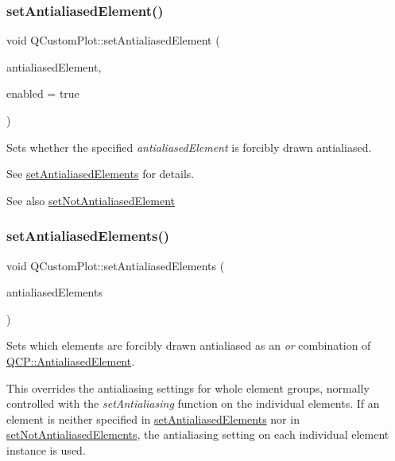 \subsubsection{\texorpdfstring{setAntialiasedElement()}{setAntialiasedElement()}}
{\footnotesize\ttfamily void Q\+Custom\+Plot\+::set\+Antialiased\+Element (\begin{DoxyParamCaption}\item[{\mbox{\hyperlink{namespace_q_c_p_ae55dbe315d41fe80f29ba88100843a0c}{Q\+C\+P\+::\+Antialiased\+Element}}}]{antialiased\+Element,  }\item[{bool}]{enabled = {\ttfamily true} }\end{DoxyParamCaption})}

Sets whether the specified {\itshape antialiased\+Element} is forcibly drawn antialiased.

See \mbox{\hyperlink{class_q_custom_plot_af6f91e5eab1be85f67c556e98c3745e8}{set\+Antialiased\+Elements}} for details.

\begin{DoxySeeAlso}{See also}
\mbox{\hyperlink{class_q_custom_plot_afc657938a707c890e449ae89203a076d}{set\+Not\+Antialiased\+Element}} 
\end{DoxySeeAlso}
\mbox{\label{class_q_custom_plot_af6f91e5eab1be85f67c556e98c3745e8}} 
\subsubsection{\texorpdfstring{setAntialiasedElements()}{setAntialiasedElements()}}
{\footnotesize\ttfamily void Q\+Custom\+Plot\+::set\+Antialiased\+Elements (\begin{DoxyParamCaption}\item[{const Q\+C\+P\+::\+Antialiased\+Elements \&}]{antialiased\+Elements }\end{DoxyParamCaption})}

Sets which elements are forcibly drawn antialiased as an {\itshape or} combination of \mbox{\hyperlink{namespace_q_c_p_ae55dbe315d41fe80f29ba88100843a0c}{Q\+C\+P\+::\+Antialiased\+Element}}.

This overrides the antialiasing settings for whole element groups, normally controlled with the {\itshape set\+Antialiasing} function on the individual elements. If an element is neither specified in \mbox{\hyperlink{class_q_custom_plot_af6f91e5eab1be85f67c556e98c3745e8}{set\+Antialiased\+Elements}} nor in \mbox{\hyperlink{class_q_custom_plot_ae10d685b5eabea2999fb8775ca173c24}{set\+Not\+Antialiased\+Elements}}, the antialiasing setting on each individual element instance is used.

